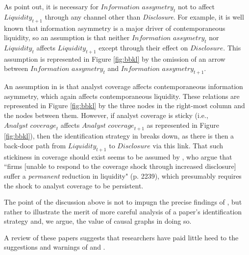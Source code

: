 \documentclass[11pt]{amsart}
\begin{document}
As \citet{Balakrishnan:2014js} point out, it is necessary for $\textit{Information assymetry}_t$ not to affect $\textit{Liquidity}_{t+1}$ through any channel other than \textit{Disclosure}.
For example, it is well known that information asymmetry is a major driver of contemporaneous liquidity, so an assumption is that neither $\textit{Information assymetry}_t$ nor $\textit{Liquidity}_t$ affects $\textit{Liquidity}_{t+1}$ except through their effect on $\textit{Disclosure}$. 
This assumption is represented in Figure \ref{fig:bbkl} by the omission of an arrow between $\textit{Information assymetry}_t$ and $\textit{Information assymetry}_{t+1}$.

An assumption in \citet{Kelly:2012ih} is that analyst coverage affects contemporaneous information asymmetry, which again affects contemporaneous liquidity.
These relations are represented in Figure \ref{fig:bbkl} by the three nodes in the right-most column and the nodes between them.
However, if analyst coverage is sticky (i.e., $\textit{Analyst coverage}_t$ affects $\textit{Analyst coverage}_{t+1}$ as represented in Figure \ref{fig:bbkl}), then the identification strategy in \citet{Balakrishnan:2014js} breaks down, as there is then a back-door path from $\textit{Liquidity}_{t+1}$ to $\textit{Disclosure}$ via this link.
That such stickiness in coverage should exist seems to be assumed by \citet{Balakrishnan:2014js}, who argue that ``firms [unable to respond  to the coverage shock through increased disclosure] suffer a \emph{permanent} reduction in liquidity" (p. 2239), which presumably requires the shock to analyst coverage to be persistent.

The point of the discussion above is not to impugn the precise findings of \citet{Balakrishnan:2014js}, but rather to illustrate the merit of more careful analysis of a paper's identification strategy and, we argue, the value of causal graphs in doing so.


A review of these papers suggests that researchers have paid little heed to the suggestions and warnings of  \citet{Larcker:2010fq} and \citet{Roberts:2013cz}.
\end{document}
